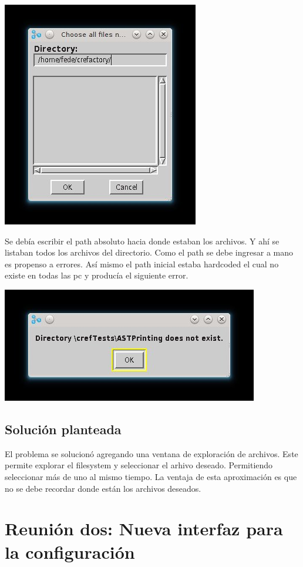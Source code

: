 \documentclass[a4paper,oneside,10pt]{article}
\begin{document}
\includegraphics{images/codigo_original/carga.jpeg}

Se deb\'ia escribir el path absoluto hacia donde estaban los archivos. Y ah\'i se listaban todos los archivos del directorio. Como el path se debe ingresar a mano es propenso a errores.
As\'i mismo el path inicial estaba hardcoded el cual no existe en todas las pc y producía el siguiente error.

\includegraphics{images/codigo_original/error.jpeg}

\subsection{Soluci\'on planteada}
El problema se solucion\'o agregando una ventana de exploraci\'on de archivos. Este permite explorar el filesystem y seleccionar el arhivo deseado. Permitiendo seleccionar m\'as de uno al mismo tiempo.
La ventaja de esta aproximaci\'on es que no se debe recordar donde est\'an los archivos deseados.

\section{Reuni\'on dos: Nueva interfaz para la configuraci\'on}
\end{document}
